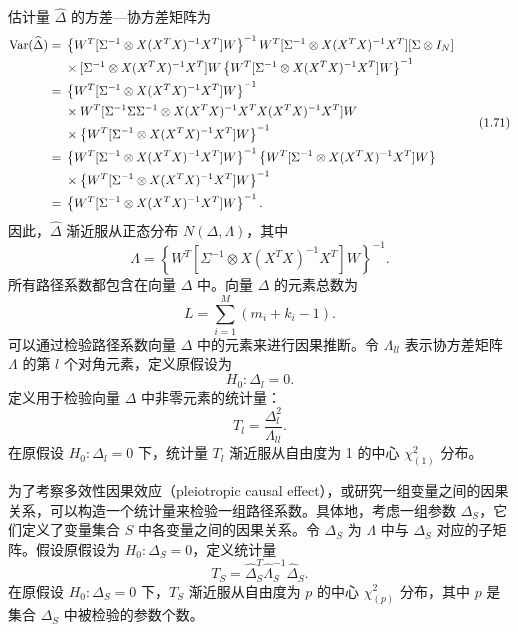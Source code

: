 估计量 $\widehat\Delta$ 的方差—协方差矩阵为
{\small
\begin{equation}
 \begin{aligned}
 \operatorname{Var}(\widehat\Delta)
 ={}&\left\{W^{T}[\Sigma^{-1}\otimes X(X^{T}X)^{-1}X^{T}]W\right\}^{-1}
       W^{T}[\Sigma^{-1}\otimes X(X^{T}X)^{-1}X^{T}][\Sigma\otimes I_N]\\
 &{}\times[\Sigma^{-1}\otimes X(X^{T}X)^{-1}X^{T}]W
       \left\{W^{T}[\Sigma^{-1}\otimes X(X^{T}X)^{-1}X^{T}]W\right\}^{-1}\\
 ={}&\left\{W^{T}[\Sigma^{-1}\otimes X(X^{T}X)^{-1}X^{T}]W\right\}^{-1}\\
 &{}\times W^{T}
       [\Sigma^{-1}\Sigma\Sigma^{-1}\otimes
          X(X^{T}X)^{-1}X^{T}X(X^{T}X)^{-1}X^{T}]W\\
 &{}\times\left\{W^{T}[\Sigma^{-1}\otimes X(X^{T}X)^{-1}X^{T}]W\right\}^{-1}\\
 ={}&\left\{W^{T}[\Sigma^{-1}\otimes X(X^{T}X)^{-1}X^{T}]W\right\}^{-1}
       \left\{W^{T}[\Sigma^{-1}\otimes X(X^{T}X)^{-1}X^{T}]W\right\}\\
 &{}\times\left\{W^{T}[\Sigma^{-1}\otimes X(X^{T}X)^{-1}X^{T}]W\right\}^{-1}\\
 ={}&\left\{W^{T}[\Sigma^{-1}\otimes X(X^{T}X)^{-1}X^{T}]W\right\}^{-1}.
 \end{aligned}
 \tag{1.71}
\end{equation}
}
因此，$\widehat\Delta$ 渐近服从正态分布 $N(\Delta,\Lambda)$，其中
\begin{equation}
 \Lambda=
 \left\{W^{T}[\Sigma^{-1}\otimes X(X^{T}X)^{-1}X^{T}]W\right\}^{-1}.
 \tag{1.72}
\end{equation}
所有路径系数都包含在向量 $\Delta$ 中。向量 $\Delta$ 的元素总数为
\[
 L=\sum_{i=1}^{M}(m_i+k_i-1).
\]
可以通过检验路径系数向量 $\Delta$ 中的元素来进行因果推断。令 $\Lambda_{ll}$ 表示协方差矩阵 $\Lambda$ 的第 $l$ 个对角元素，定义原假设为
\[
 H_0:\Delta_l=0.
\]
定义用于检验向量 $\Delta$ 中非零元素的统计量：
\begin{equation}
 T_l=\frac{\Delta_l^2}{\Lambda_{ll}}.
 \tag{1.73}
\end{equation}
在原假设 $H_0:\Delta_l=0$ 下，统计量 $T_l$ 渐近服从自由度为 1 的中心 $\chi^2_{(1)}$ 分布。

为了考察多效性因果效应（pleiotropic causal effect），或研究一组变量之间的因果关系，可以构造一个统计量来检验一组路径系数。具体地，考虑一组参数 $\Delta_S$，它们定义了变量集合 $S$ 中各变量之间的因果关系。令 $\Delta_S$ 为 $\Lambda$ 中与 $\Delta_S$ 对应的子矩阵。假设原假设为 $H_0:\Delta_S=0$，定义统计量
\begin{equation}
 T_S=\widehat\Delta_S^{T}\widehat\Lambda_S^{-1}\widehat\Delta_S.
 \tag{1.74}
\end{equation}
在原假设 $H_0:\Delta_S=0$ 下，$T_S$ 渐近服从自由度为 $p$ 的中心 $\chi^2_{(p)}$ 分布，其中 $p$ 是集合 $\Delta_S$ 中被检验的参数个数。


